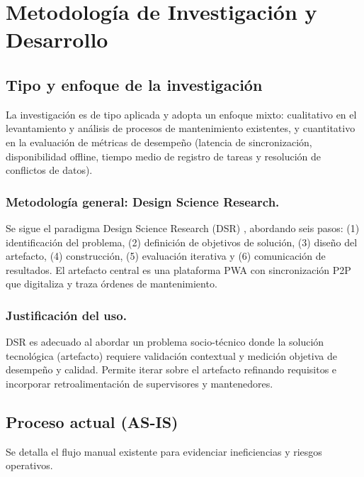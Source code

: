 \documentclass[10pt,a4paper]{report}
\begin{document}
\chapter*{Metodología de Investigación y Desarrollo}

\section*{Tipo y enfoque de la investigación} La investigación es de tipo aplicada y adopta un enfoque mixto: cualitativo en el levantamiento y análisis de procesos de mantenimiento existentes, y cuantitativo en la evaluación de métricas de desempeño (latencia de sincronización, disponibilidad offline, tiempo medio de registro de tareas y resolución de conflictos de datos).

\subsection*{Metodología general: Design Science Research.} 
Se sigue el paradigma Design Science Research (DSR) \newline\cite{Hevner2004,Peffers2007}, abordando seis pasos: (1) identificación del problema, (2) definición de objetivos de solución, (3) diseño del artefacto, (4) construcción, (5) evaluación iterativa y (6) comunicación de resultados. El artefacto central es una plataforma PWA con sincronización P2P que digitaliza y traza órdenes de mantenimiento.

\subsection*{Justificación del uso.}
DSR es adecuado al abordar un problema socio-técnico donde la solución tecnológica (artefacto) requiere validación contextual y medición objetiva de desempeño y calidad. Permite iterar sobre el artefacto refinando requisitos e incorporar retroalimentación de supervisores y mantenedores.




\section*{Proceso actual (AS-IS)}
Se detalla el flujo manual existente para evidenciar ineficiencias y riesgos operativos.
\end{document}
